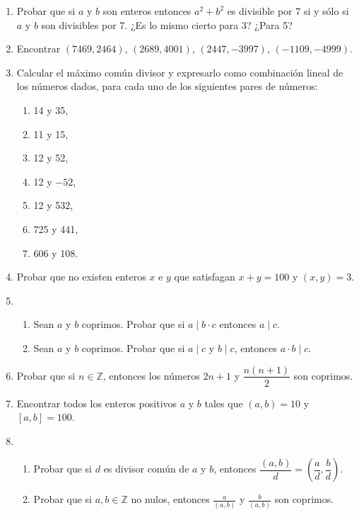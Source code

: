 \documentclass[a4paper,12pt,twoside,spanish,reqno]{amsbook}
\numberwithin{equation}{section}
\begin{document}
\begin{enumerate}
\item Probar que si $a$ y $b$ son enteros entonces $a^2+b^2$ es divisible por 7 si y sólo si $a$ y $b$ son divisibles por 7.
¿Es lo mismo cierto para 3? ¿Para 5?



\item Encontrar $(7469,2464)$, $(2689,4001)$, $(2447,-3997)$, $(-1109,-4999)$.


\item
Calcular el máximo común divisor y expresarlo como combinación lineal de los
números dados, para cada uno de  los siguientes pares de números:
\begin{multicols}{3}
\begin{enumerate}
  \item  14 y 35, 
    \item 11 y 15, 
    \item 12 y 52,
  \item 12 y $-52$,  
    \item 12 y 532,
    \item 725 y 441,
    \item 606 y 108.
\end{enumerate}
\end{multicols}




\item Probar que no existen enteros $x$ e $y$ que satisfagan $x+y=100$ y $(x,y)=3$.


\item %
\begin{enumerate}
 \item Sean $a$ y $b$ coprimos. Probar que si $a\mid b\cdot c$ entonces $a \mid c$.
 \item Sean $a$ y $b$ coprimos. Probar que si $a \mid c$ y $b \mid c$, entonces $a\cdot b \mid c$.

\end{enumerate}




\item Probar que si $n \in {\mathbb Z}$, entonces los números $2n+1$ y $\dfrac{n(n+1)}{2}$ son coprimos.




\item Encontrar todos los enteros positivos $a$ y $b$ tales que $(a,b)=10$ y $[a,b]=100$.


\item
\begin{enumerate}
\item Probar que si $d$ es divisor común de $a$ y $b$, entonces $\dfrac{(a,b)}{d} = \left(\dfrac{a}{d}, \dfrac{b}{d}\right)$.
\item Probar que si $a,b\in \mathbb Z$ no nulos, entonces  $\displaystyle \frac a{(a,b)}$ y $\displaystyle \frac b{(a,b)}$ son coprimos.
\end{enumerate}



\end{enumerate}
\end{document}
